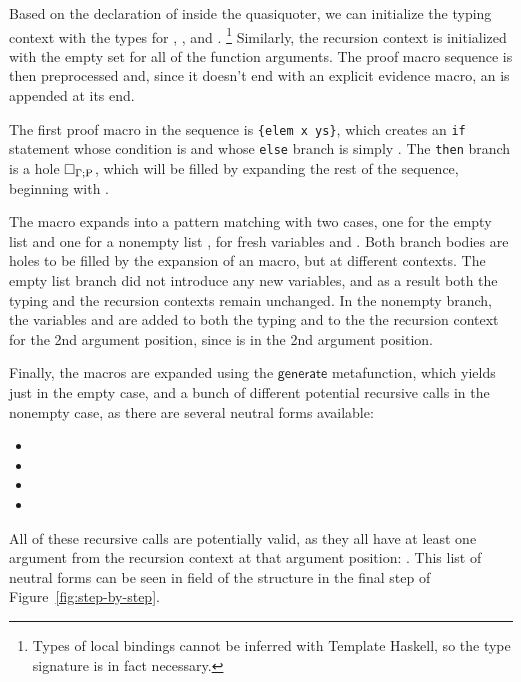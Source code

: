 Based on the declaration of  inside the quasi\-quoter,
we can initialize the typing context with the types for ,
, and .%
\footnote{Types of local bindings cannot be inferred with Template
  Haskell, so the type signature is in fact necessary.} %
%
Similarly, the recursion context is initialized with the empty set for
all of the function arguments.
%
The proof macro sequence is then preprocessed and, since it doesn't
end with an explicit evidence macro, an   is
appended at its end.

%
The first proof macro in the sequence is  \texttt{\{elem x ys\}},
which creates an \texttt{if} statement whose condition is 
and whose \texttt{else} branch is simply .
%
The \texttt{then} branch is a hole $\Box_{\Gamma ; \mathrm{P}}$, which
will be filled by expanding the rest of the sequence, beginning with
 .

The   macro expands into a pattern matching with
two cases, one for the empty list and one for a nonempty list ,
for fresh variables  and .
%
Both branch bodies are holes to be filled by the expansion of an  macro, but at different contexts.
%
The empty list branch did not introduce any new variables, and as a result
both the typing and the recursion contexts remain unchanged. In the nonempty
branch, the variables  and  are added to both the typing and to the the recursion context for the 2nd argument position, since  is in the 2nd argument position.

Finally, the  macros are expanded using the $\mathsf{generate}$ metafunction, which yields just  in the empty case, and a bunch of different potential recursive calls in the nonempty case, as there are several
neutral forms available:
\begin{itemize}
  \item {}
  \item {}
  \item {}
  \item {}
\end{itemize}
All of these recursive calls are potentially valid, as they all have
at least one argument from the recursion context at that argument
position: .  This list of neutral forms can be seen in
 field of the  structure in the final step of
Figure~\ref{fig:step-by-step}.

